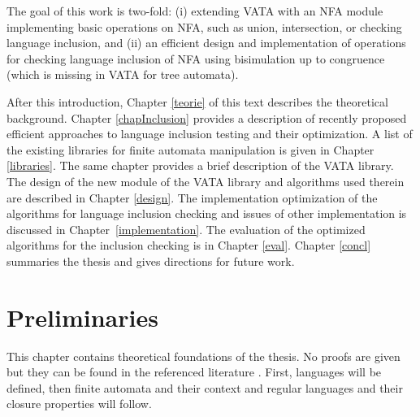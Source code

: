 The goal of this work is two-fold: (i) extending VATA with an NFA module implementing basic operations on NFA, such as union, intersection, or 
checking language inclusion, and (ii) an efficient design and implementation of operations for checking language inclusion of NFA using 
bisimulation up to congruence (which is missing in VATA for tree automata).

After this introduction, Chapter \ref{teorie} of this text describes the theoretical background. 
Chapter \ref{chapInclusion} provides a description of recently proposed 
efficient approaches to language inclusion testing and their optimization.
A list of the existing libraries for finite automata manipulation is given in Chapter \ref{libraries}. The same chapter
provides a brief description of the VATA library.
The design of the new module of the VATA library and algorithms used therein are described in Chapter \ref{design}. 
The implementation optimization of the algorithms for language inclusion checking and issues of other implementation is discussed in Chapter~\ref{implementation}.
The evaluation of the optimized algorithms for the inclusion checking is in Chapter \ref{eval}. Chapter \ref{concl} summaries the thesis and gives directions for
future work.

\chapter{Preliminaries}
This chapter contains theoretical foundations of the thesis. No proofs are given but they can be found in the referenced literature \cite{kozen,ullman}. 
First, languages will be defined, then finite automata and their context and regular languages and their closure properties will follow. 
\label{teorie}

